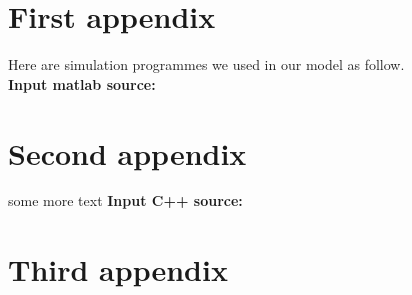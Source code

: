 \section{First appendix}
\lipsum[13]
Here are simulation programmes we used in our model as follow.\\
\textbf{\textcolor[rgb]{0.98,0.00,0.00}{Input matlab source:}}


\section{Second appendix}
some more text \textcolor[rgb]{0.98,0.00,0.00}{\textbf{Input C++ source:}}


\section{Third appendix}
 